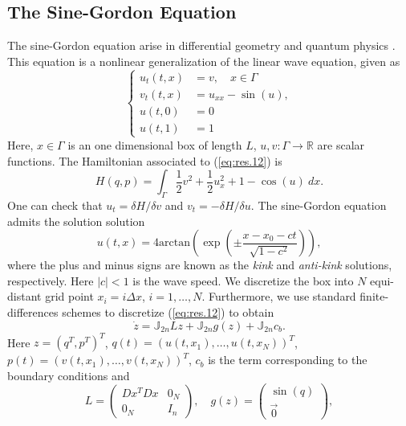 \subsection{The Sine-Gordon Equation} \label{sec:res.2}
The sine-Gordon equation arise in differential geometry and quantum physics \cite{Misumi2015}. This equation is a nonlinear generalization of the linear wave equation, given as
\begin{equation} \label{eq:res.12}
\left\{
\begin{aligned}
	u_{t}(t,x) &= v, \quad x\in \Gamma\\
	v_t(t,x) &= u_{xx} - \sin(u), \\
	u(t,0) &= 0 \\
	u(t,1) &= 1
\end{aligned}
\right.
\end{equation}
Here, $x\in \Gamma$ is an one dimensional box of length $L$, $u,v: \Gamma \to \mathbb R$ are scalar functions. The Hamiltonian associated to (\ref{eq:res.12}) is
\begin{equation} \label{eq:res.13}
	H(q,p) = \int_{\Gamma} \frac 1 2 v^2 + \frac 1 2 u_x^2 + 1 - \cos(u) \ dx.
\end{equation}
One can check that $u_{t} = \delta H / \delta v$ and $v_{t} = - \delta H / \delta u$. The sine-Gordon equation admits the solution solution
\begin{equation} \label{eq:res.14}
	u(t,x) = 4 \text{arctan}\left( \exp ( \pm \frac{x - x_0 - ct}{\sqrt{1-c^2}} ) \right),
\end{equation}
where the plus and minus signs are known as the \emph{kink} and \emph{anti-kink} solutions, respectively. Here $|c|<1$ is the wave speed. We discretize the box into $N$ equi-distant grid point $x_i = i\Delta x$, $i=1,\dots,N$. Furthermore, we use standard finite-differences schemes to discretize (\ref{eq:res.12}) to obtain
\begin{equation}
	\dot z = \mathbb J_{2n} L z + \mathbb J_{2n} g(z) + \mathbb J_{2n} c_b.
\end{equation}
Here $z = (q^T,p^T)^T$, $q(t) = (u(t,x_1),\dots,u(t,x_N))^T$, $p(t) = (v(t,x_1),\dots,v(t,x_N))^T$, $c_b$ is the term corresponding to the boundary conditions and
\begin{equation}
	L = 
	\begin{pmatrix}
		Dx^TDx & 0_N \\
		0_N & I_n
	\end{pmatrix}, 
	\quad
	g(z) = 
	\begin{pmatrix}
	\sin(q) \\
	\vec 0
	\end{pmatrix},
\end{equation}
